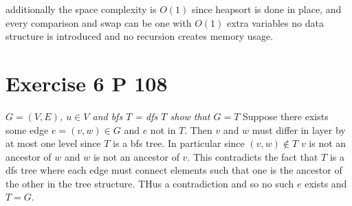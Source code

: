 \documentclass{amsart}
\begin{document}
additionally the space complexity is $O(1)$ since heapsort is done in place, and every comparison and swap can be one with $O(1)$ extra variables
no data structure is introduced and no recursion creates memory usage.


\section{Exercise 6 P 108}
\emph{
    $G = (V,E)$,  $u \in V$ and bfs  $T$ = dfs  $T$ show that $G = T$
}
Suppose there exists some edge $e = (v,w) \in G$ and $e$ not in  $T$. Then
$v$ and $w$ must differ in layer by at most one level since $T$ is a bfs tree. In particular since 
$(v,w) \not\in T$  $v$ is not an ancestor of $w$ and $w$ is not an ancestor of $v$.
This contradicts the fact that $T$ is a dfs tree where each edge must connect 
elements such that one is the ancestor of the other in the tree structure. THus a contradiction
and so no such $e$ exists and $T = G$. 
\end{document}
